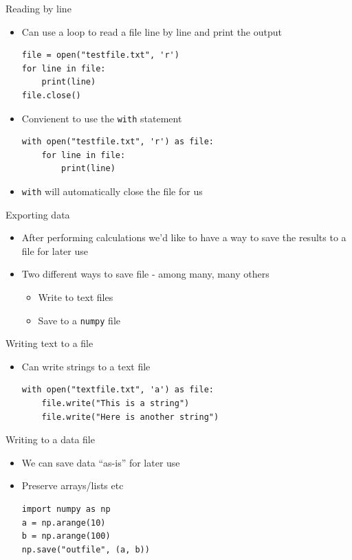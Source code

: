 \documentclass[11pt,professionalfonts]{beamer}
\begin{document}
\begin{frame}[fragile]{Reading by line}
    \begin{itemize}
        \item Can use a loop to read a file line by line and print the output
            \begin{verbatim}
file = open("testfile.txt", 'r')
for line in file:
    print(line)
file.close()
            \end{verbatim}
        \item Convienent to use the \texttt{with} statement
            \begin{verbatim}
with open("testfile.txt", 'r') as file:
    for line in file:
        print(line)
            \end{verbatim}
        \item \texttt{with} will automatically close the file for us
    \end{itemize}
\end{frame}

\begin{frame}[fragile]{Exporting data}
    \begin{itemize}
        \item After performing calculations we'd like to have a way to save the results to a file for later use
        \item Two different ways to save file - among many, many others
            \begin{itemize}
                \item Write to text files
                \item Save to a \texttt{numpy} file 
            \end{itemize}
    \end{itemize}
\end{frame}

\begin{frame}[fragile]{Writing text to a file}
    \begin{itemize}
        \item Can write strings to a text file
            \begin{verbatim}
with open("textfile.txt", 'a') as file:
    file.write("This is a string")
    file.write("Here is another string")
            \end{verbatim}
    \end{itemize}
\end{frame}

\begin{frame}[fragile]{Writing to a data file}
    \begin{itemize}
        \item We can save data ``as-is'' for later use
        \item Preserve arrays/lists etc
            \begin{verbatim}
import numpy as np
a = np.arange(10)
b = np.arange(100)
np.save("outfile", (a, b))
            \end{verbatim}
    \end{itemize}
\end{frame}
\end{document}
